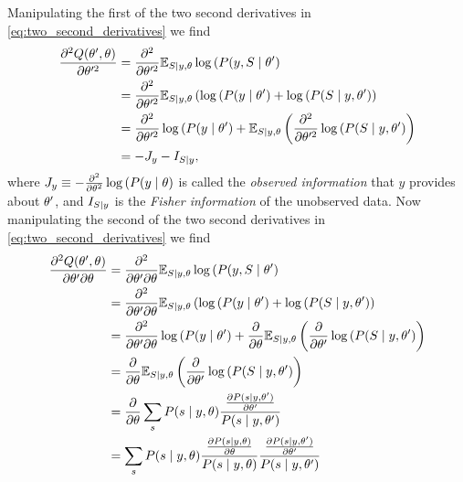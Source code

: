 Manipulating the first of the two second derivatives in
\eqref{eq:two_second_derivatives} we find
\begin{align}
  \frac{\partial^2 Q(\theta',  \theta)}{\partial \theta'^2}
  &= \frac{\partial^2}{\partial \theta'^2} \mathbb{E}_{S \mid y, \theta}
    \log \left( P(y, S \mid \theta' \right) \\
  &= \frac{\partial^2}{\partial \theta'^2} \mathbb{E}_{S \mid y, \theta}
    \left( \log \left( P(y \mid \theta' \right) + \log \left( P(S
    \mid y, \theta' \right) \right)\\
  &=  \frac{\partial^2}{\partial \theta'^2} \log \left( P(y \mid
    \theta' \right) + \mathbb{E}_{S \mid y, \theta} \left(
    \frac{\partial^2}{\partial \theta'^2} \log \left( P(S \mid y,
    \theta' \right) \right) \\
  \label{eq:second_partial_information}
  &= -J_y - I_{S \mid y},
\end{align}
where
$J_y\equiv-\frac{\partial^2}{\partial \theta^2} \log \left( P(y \mid
  \theta \right)$ is called the \emph{observed information}
that $y$ provides about $\theta'$, and $I_{S \mid y}$ is the \emph{Fisher
  information} of the unobserved data.  Now manipulating the second of
the two second derivatives in \eqref{eq:two_second_derivatives} we
find
\begin{align}
  \frac{\partial^2 Q(\NewParameters,  \OldParameters)}{\partial \NewParameters \partial
  \OldParameters}
  &= \frac{\partial^2}{\partial \NewParameters \partial \OldParameters} \EV_{S \given y, \OldParameters}
    \log \left( P(y, S \given \NewParameters \right) \\
  &= \frac{\partial^2}{\partial \NewParameters \partial \OldParameters} \EV_{S \given y, \OldParameters}
    \left( \log \left( P(y \given \NewParameters \right) + \log \left( P(S
    \given y, \NewParameters \right) \right)\\
  &= \frac{\partial^2}{\partial \NewParameters \partial \OldParameters} \log \left( P(y \given
    \NewParameters \right) + \frac{\partial}{\partial \OldParameters} \EV_{S \given y, \OldParameters} \left(
    \frac{\partial}{\partial \NewParameters} \log \left( P(S \given y,
    \NewParameters \right) \right) \\
  &=  \frac{\partial}{\partial \OldParameters} \EV_{S \given y, \OldParameters} \left(
    \frac{\partial}{\partial \NewParameters} \log \left( P(S \given y,
    \NewParameters \right) \right) \\
  &= \frac{\partial}{\partial \OldParameters} \sum_s P(s \given y, \OldParameters) %
    \frac{ %
    \frac{\partial P(s \given y,\NewParameters )}{\partial \NewParameters}
    }{P(s \given y,\NewParameters )}  \\
  &= \sum_s P(s \given y, \OldParameters) %
    \frac{ %
    \frac{\partial P(s \given y,\OldParameters )}{\partial \OldParameters}
    }{P(s \given y,\OldParameters )}
    \frac{ %
    \frac{\partial P(s \given y,\NewParameters )}{\partial \NewParameters}
    }{P(s \given y,\NewParameters )}
\end{align}
